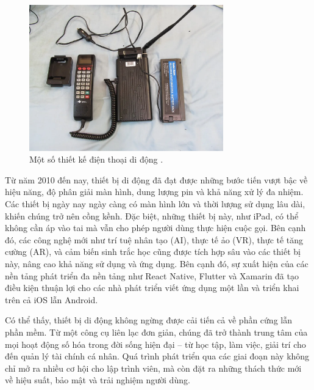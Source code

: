     \begin{figure}[H]
      \centering
      \includegraphics[width=0.75\textwidth]{images/thiet_ke_dtdd.png}
      \caption{Một số thiết kế điện thoại di động \cite{androidcentral2021}.}
      \label{fig:fig2}
    \end{figure}

\begin{flushleft}
  \hspace*{0.8cm}
  Từ năm 2010 đến nay, thiết bị di động đã đạt được những bước tiến vượt bậc về hiệu năng, độ phân giải màn hình, dung lượng pin và khả năng xử lý đa nhiệm. Các thiết bị ngày nay ngày càng có màn hình lớn và thời lượng sử dụng lâu dài, khiến chúng trở nên cồng kềnh. Đặc biệt, những thiết bị này, như iPad, có thể không cần áp vào tai mà vẫn cho phép người dùng thực hiện cuộc gọi. Bên cạnh đó, các công nghệ mới như trí tuệ nhân tạo (AI), thực tế ảo (VR), thực tế tăng cường (AR), và cảm biến sinh trắc học cũng được tích hợp sâu vào các thiết bị này, nâng cao khả năng sử dụng và ứng dụng. Bên cạnh đó, sự xuất hiện của các nền tảng phát triển đa nền tảng như React Native, Flutter và Xamarin đã tạo điều kiện thuận lợi cho các nhà phát triển viết ứng dụng một lần và triển khai trên cả iOS lẫn Android.
\end{flushleft}

\begin{flushleft}
  \hspace*{0.8cm}Có thể thấy, thiết bị di động không ngừng được cải tiến cả về phần cứng lẫn phần mềm. Từ một công cụ liên lạc đơn giản, chúng đã trở thành trung tâm của mọi hoạt động số hóa trong đời sống hiện đại – từ học tập, làm việc, giải trí cho đến quản lý tài chính cá nhân. Quá trình phát triển qua các giai đoạn này không chỉ mở ra nhiều cơ hội cho lập trình viên, mà còn đặt ra những thách thức mới về hiệu suất, bảo mật và trải nghiệm người dùng.
\end{flushleft}

